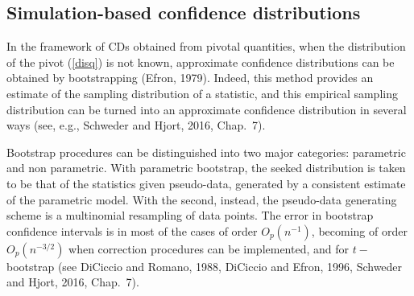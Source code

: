 \documentclass[preprint,12pt,authoryear]{elsarticle}
\begin{document}

\subsection{Simulation-based confidence distributions}

In the framework of CDs obtained from pivotal quantities, when the distribution of the pivot (\ref{disq}) is not known, approximate confidence distributions can be obtained by bootstrapping {(Efron, 1979)}. Indeed, this method provides an estimate of the sampling distribution of a statistic, and this empirical sampling distribution can be turned into an approximate confidence distribution in several ways (see, e.g., Schweder and Hjort, 2016, Chap.\ 7).
 
Bootstrap  procedures can be distinguished into two major categories: parametric and non parametric. With parametric bootstrap, the seeked distribution is taken to be that of the statistics given pseudo-data, generated by a consistent  estimate of the parametric model. With the second, instead, the pseudo-data generating scheme is a multinomial resampling of data points.
The error in bootstrap confidence intervals  is in most of the cases of order $O_p(n^{-1})$, becoming of order  $O_p(n^{-3/2})$ when correction procedures  can be implemented, and for $t-$bootstrap (see DiCiccio and Romano, 1988,  { DiCiccio and Efron}, 1996, Schweder and Hjort, 2016, Chap.\ 7).
\end{document}
